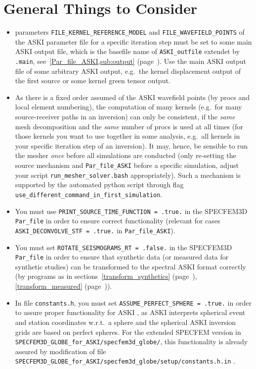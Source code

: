 \documentclass[12pt,a4paper]{article}
\newcommand{\lcode}[1]{\nolinkurl{#1}}
\newcommand{\ASKI}{ {\ttfamily ASKI} }
\newcommand{\myref}[1]{\ref{#1} (page~\pageref{#1})}
\begin{document}
\section{General Things to Consider} \label{general_stuff}
%
\begin{itemize}
\item parameters \lcode{FILE_KERNEL_REFERENCE_MODEL} and \lcode{FILE_WAVEFIELD_POINTS} 
  of the \ASKI{} parameter file for a specific iteration step must be set to some main \ASKI{} output file,
  which is the basefile name of \lcode{ASKI_outfile} extendet by \lcode{.main}, see~\myref{Par_file_ASKI,sub:output}.
  Use the main \ASKI{} output file of some arbitrary \ASKI{} output, e.g.\ the kernel displacement output of the first source
  or some kernel green tensor output.
\item As there is a fixed order assumed of the \ASKI{} wavefield points (by procs and local element numbering), the 
  computation of many kernels (e.g.\ for many source-receiver paths in an inversion) can only be consistent, if the 
  \emph{same} mesh decomposition and the \emph{same} number of procs is used at all times 
  (for those kernels you want to use together in some analysis, e.g.\ all kernels in your specific iteration 
  step of an inversion).
  It may, hence, be sensible to run the mesher \emph{once} before all simulations are conducted (only re-setting the
  source mechanism and \lcode{Par_file_ASKI} before a specific simulation, adjust your 
  script \lcode{run_mesher_solver.bash} appropriately). Such a mechanism is supported by the automated python script
  through flag \lcode{use_different_command_in_first_simulation}.
\item You must use \lcode{PRINT_SOURCE_TIME_FUNCTION = .true.} in the SPECFEM3D \lcode{Par_file} in order to ensure correct
  functionality (relevant for cases \lcode{ASKI_DECONVOLVE_STF = .true.} in \lcode{Par_file_ASKI}).
\item You must set \lcode{ROTATE_SEISMOGRAMS_RT = .false.} in the SPECFEM3D \lcode{Par_file} in order to ensure that 
  synthetic data (or measured data for synthetic studies) can be transformed to the spectral \ASKI{} format correctly (by programs
  as in sections~\myref{transform_synthetics}, \myref{transform_measured}).
\item In file \lcode{constants.h}, you must set \lcode{ASSUME_PERFECT_SPHERE = .true.} in order to
  assure proper functionality for \ASKI{}, as \ASKI{} interprets spherical event and station coordinates w.r.t.\ a sphere
  and the spherical \ASKI{} inversion grids are based on perfect spheres. For the extended SPECFEM version
  in \lcode{SPECFEM3D_GLOBE_for_ASKI/specfem3d_globe/}, this functionality is already assured by modification of file 
  \lcode{SPECFEM3D_GLOBE_for_ASKI/specfem3d_globe/setup/constants.h.in} .
\end{itemize}
%
\end{document}
